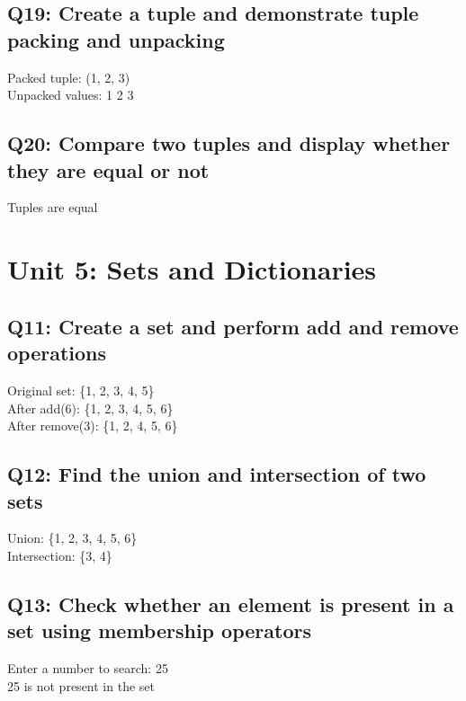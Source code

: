 \documentclass[11pt,a4paper]{article}
\begin{document}
\subsection{Q19: Create a tuple and demonstrate tuple packing and unpacking}
\begin{outputbox}
Packed tuple: (1, 2, 3)\\
Unpacked values: 1 2 3
\end{outputbox}

\subsection{Q20: Compare two tuples and display whether they are equal or not}
\begin{outputbox}
Tuples are equal
\end{outputbox}

\section{Unit 5: Sets and Dictionaries}

\subsection{Q11: Create a set and perform add and remove operations}
\begin{outputbox}
Original set: \{1, 2, 3, 4, 5\}\\
After add(6): \{1, 2, 3, 4, 5, 6\}\\
After remove(3): \{1, 2, 4, 5, 6\}
\end{outputbox}

\subsection{Q12: Find the union and intersection of two sets}
\begin{outputbox}
Union: \{1, 2, 3, 4, 5, 6\}\\
Intersection: \{3, 4\}
\end{outputbox}

\subsection{Q13: Check whether an element is present in a set using membership operators}
\begin{outputbox}
Enter a number to search: 25\\
25 is not present in the set
\end{outputbox}
\end{document}
